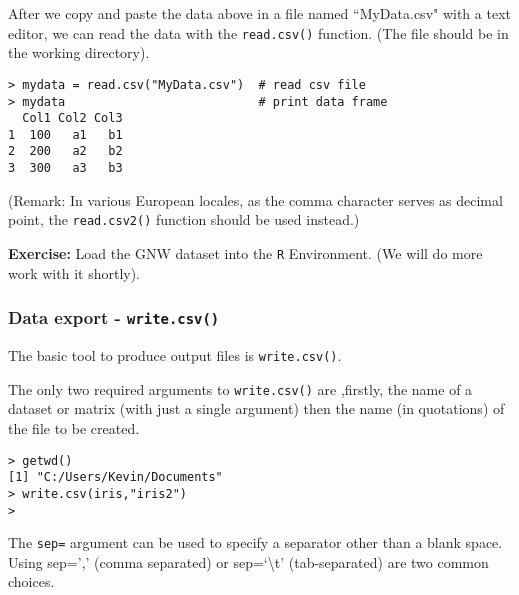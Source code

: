 \documentclass[a4paper,12pt]{article}
\begin{document}
After we copy and paste the data above in a file named ``MyData.csv" with a text editor, we can read the data with the \texttt{read.csv()} function. (The file should be in the working directory).
\begin{verbatim}
> mydata = read.csv("MyData.csv")  # read csv file
> mydata                           # print data frame
  Col1 Col2 Col3
1  100   a1   b1
2  200   a2   b2
3  300   a3   b3
\end{verbatim}
(Remark: In various European locales, as the comma character serves as decimal point, the \texttt{read.csv2()} function should be used instead.)

\bigskip
\noindent \textbf{Exercise:} Load the GNW dataset into the \texttt{R} Environment. (We will do more work with it shortly).

\subsubsection{Data export - \texttt{write.csv()}}
The basic tool to produce output files is \texttt{write.csv()}.

The only two required arguments to \texttt{write.csv()} are ,firstly, the name of a dataset or matrix (with just a single argument) then the name (in quotations) of the file to be created.

\begin{framed}
\begin{verbatim}
> getwd()
[1] "C:/Users/Kevin/Documents"
> write.csv(iris,"iris2")
> 
\end{verbatim}
\end{framed}



The  \texttt{sep=} argument can be used to specify a separator other than a blank space. Using sep=',' (comma separated) or sep=`\textbackslash t' (tab-separated) are two common choices.
\end{document}
